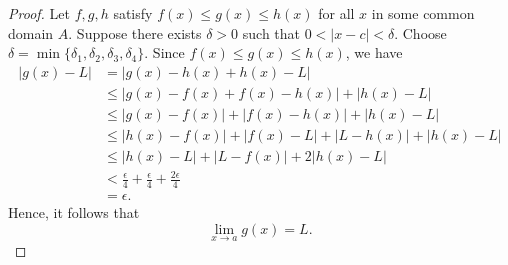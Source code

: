\begin{proof}
Let \( f, g, h \) satisfy \( f(x) \leq g(x) \leq h(x) \) for all \( x  \) in some common domain \( A  \). 
Suppose there exists \( \delta > 0  \) such that \(  0 < | x - c  | < \delta  \). Choose \( \delta = \min \{ \delta_1, \delta_2, \delta_3, \delta_4  \}  \). Since \( f(x) \leq g(x) \leq h(x) \), we have 
\begin{align*}
    | g(x) - L  | &= | g(x) - h(x) + h(x) - L  |  \\
                  &\leq | g(x) - f(x) + f(x) - h(x)  | + | h(x) - L  | \\ 
                  &\leq | g(x) - f(x) | + | f(x) - h(x)  | + | h(x) - L  | \\
                  &\leq | h(x) - f(x)  | + | f(x) - L  | + | L - h(x) | + | h(x) - L  | \\
                  &\leq | h(x) - L| + | L - f(x) | + 2| h(x) - L  | \\
                  &< \frac{ \epsilon  }{ 4 } + \frac{ \epsilon  }{ 4 } + \frac{ 2 \epsilon  }{ 4 } \\
                  &= \epsilon.
\end{align*}
Hence, it follows that 
\[  \lim_{ x \to a } g(x) = L. \]
\end{proof}







